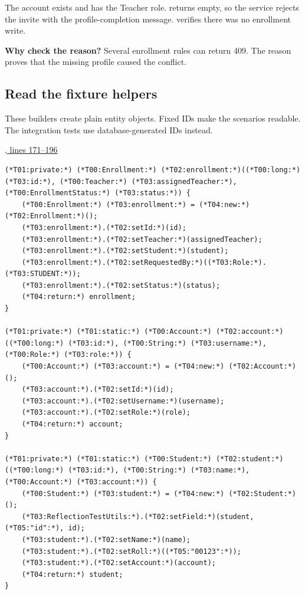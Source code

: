 The account exists and has the Teacher role.  returns
empty, so the service rejects the invite with the profile-completion message.
 verifies there was no enrollment write.

\textbf{Why check the reason?}
Several enrollment rules can return 409. The reason proves that the missing
profile caused the conflict.

\clearpage
\subsection{Read the fixture helpers}
These builders create plain entity objects. Fixed IDs make the scenarios
readable. The integration tests use database-generated IDs instead.

\par\smallskip
{\small\href{\repo/blob/5d22aed7f6d4ef1e4c0b0c0dabf2962ba4b47608/src/test/java/com/example/fmschool/EnrollmentServiceUnitTests.java#L171-L196}{, lines 171--196}}
\begin{lstlisting}[style=vsJava,firstnumber=171]
(*T01:private:*) (*T00:Enrollment:*) (*T02:enrollment:*)((*T00:long:*) (*T03:id:*), (*T00:Teacher:*) (*T03:assignedTeacher:*), (*T00:EnrollmentStatus:*) (*T03:status:*)) {
    (*T00:Enrollment:*) (*T03:enrollment:*) = (*T04:new:*) (*T02:Enrollment:*)();
    (*T03:enrollment:*).(*T02:setId:*)(id);
    (*T03:enrollment:*).(*T02:setTeacher:*)(assignedTeacher);
    (*T03:enrollment:*).(*T02:setStudent:*)(student);
    (*T03:enrollment:*).(*T02:setRequestedBy:*)((*T03:Role:*).(*T03:STUDENT:*));
    (*T03:enrollment:*).(*T02:setStatus:*)(status);
    (*T04:return:*) enrollment;
}

(*T01:private:*) (*T01:static:*) (*T00:Account:*) (*T02:account:*)((*T00:long:*) (*T03:id:*), (*T00:String:*) (*T03:username:*), (*T00:Role:*) (*T03:role:*)) {
    (*T00:Account:*) (*T03:account:*) = (*T04:new:*) (*T02:Account:*)();
    (*T03:account:*).(*T02:setId:*)(id);
    (*T03:account:*).(*T02:setUsername:*)(username);
    (*T03:account:*).(*T02:setRole:*)(role);
    (*T04:return:*) account;
}

(*T01:private:*) (*T01:static:*) (*T00:Student:*) (*T02:student:*)((*T00:long:*) (*T03:id:*), (*T00:String:*) (*T03:name:*), (*T00:Account:*) (*T03:account:*)) {
    (*T00:Student:*) (*T03:student:*) = (*T04:new:*) (*T02:Student:*)();
    (*T03:ReflectionTestUtils:*).(*T02:setField:*)(student, (*T05:"id":*), id);
    (*T03:student:*).(*T02:setName:*)(name);
    (*T03:student:*).(*T02:setRoll:*)((*T05:"00123":*));
    (*T03:student:*).(*T02:setAccount:*)(account);
    (*T04:return:*) student;
}
\end{lstlisting}


